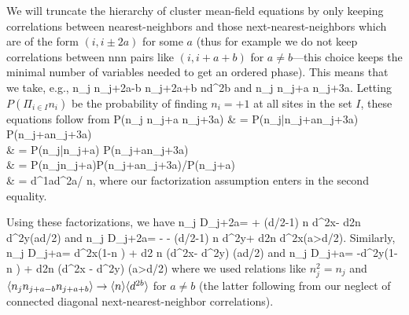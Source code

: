 \documentclass[pra,aps,twocolumn,groupedaddress,superscriptaddress,nofootinbib,preprintnumbers]{revtex4-2}
\begin{document}
\begin{widetext}
		We will truncate the hierarchy of cluster mean-field equations by only keeping correlations between nearest-neighbors and those next-nearest-neighbors which are of the form $(i,i\pm2a)$ for some $a$ (thus for example we do not keep correlations between nnn pairs like $(i,i+a+b)$ for $a\neq b$---this choice keeps the minimal number of variables needed to get an ordered phase). This means that we take, e.g.,
		\be \lan n_j n_{j+2a-b} n_{j+2a+b} \ran \ra \lan n\ran \lan d^{2b} \ran \ee 
		and
		\be \lan n_j n_{j+a} n_{j+3a}\ran \ra {}.\ee 
		Letting $P(\Pi_{i\in I} n_i)$ be the probability of finding $n_i=+1$ at all sites in the set $I$, these equations follow from 
		\bea P(n_j n_{j+a} n_{j+3a}) & = P(n_j|n_{j+a}n_{j+3a}) P(n_{j+a}n_{j+3a}) \\ & = P(n_j|n_{j+a}) P(n_{j+a}n_{j+3a}) \\ & = P(n_jn_{j+a})P(n_{j+a}n_{j+3a})/P(n_{j+a}) \\ & = \lan d^{1a}\ran \lan d^{2a}\ran / \lan n\ran,\eea
		where our factorization assumption enters in the second equality. 
		
		Using these factorizations, we have 
		\be \lan n_j D_{j+2a}\ran =  + (d/2-1) \lan n \ran \lan d^{2x}\ran - \frac d2\lan n \ran \lan \ob d^{2y}\ran  \qq (a\leq d/2) \ee 
		and 
		\be \lan \ob n_j D_{j+2a}\ran = - - (d/2-1) \lan \ob n \ran \lan \ob d^{2y}\ran + \frac d2\lan \ob n \ran \lan d^{2x}\ran  \qq (a>d/2). \ee 
		Similarly, 
		\be \lan n_j D_{j+a}\ran = \lan d^{2x}\ran (1-\lan n \ran) + \frac d2 \lan n \ran (\lan d^{2x}\ran - \lan \ob d^{2y}\ran ) \qq(a\leq d/2)\ee 
		and 
		\be \lan \ob n_j D_{j+a}\ran = -\lan \ob d^{2y}\ran (1-\lan \ob n \ran) + \frac d2\lan \ob n \ran (\lan d^{2x} \ran - \lan \ob d^{2y}\ran ) \qq (a>d/2)\ee 
		where we used relations like $n_j^2 = n_j$ and $\langle n_j n_{j+a-b} n_{j+a+b} \rangle \rightarrow  \langle n \rangle \langle d^{2b}\rangle$ for $a \neq b$ (the latter following from our neglect of connected diagonal next-nearest-neighbor correlations). 
		

\end{widetext}
\end{document}
